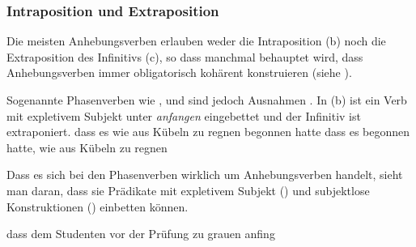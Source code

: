\subsubsection{Intraposition und Extraposition}
\label{sec-subj-rais-ie}

Die meisten Anhebungsverben erlauben weder die Intraposition (b) noch
die Extraposition des Infinitivs (c), so dass manchmal behauptet wird, dass Anhebungsverben
immer obligatorisch kohärent konstruieren (siehe \zb {}).
\eal
\label{bsp-intra-extra-scheinen}
\zl

\noindent
Sogenannte Phasenverben wie ,  und 
 sind jedoch Ausnahmen \citep[]{Kiss95a}. 
In (b) ist ein Verb mit expletivem Subjekt unter \emph{anfangen} eingebettet
und der Infinitiv ist extraponiert.
\eal
\ex
dass    es   wie aus Kübeln zu regnen begonnen hatte
\ex 
dass    es  begonnen hatte, wie aus Kübeln zu regnen
\zl

\noindent
Dass es sich bei den Phasenverben wirklich um Anhebungsverben handelt, sieht
man daran, dass sie Prädikate mit expletivem Subjekt () und subjektlose Konstruktionen ()
einbetten können.

\ea
dass dem Studenten vor der Prüfung zu grauen anfing
\z

